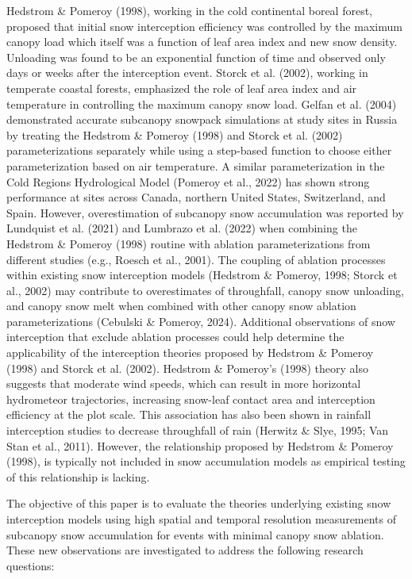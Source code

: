 \documentclass[
  letterpaper,
  DIV=11,
  numbers=noendperiod]{scrartcl}
\begin{document}
Hedstrom \& Pomeroy (1998), working in the cold continental boreal
forest, proposed that initial snow interception efficiency was
controlled by the maximum canopy load which itself was a function of
leaf area index and new snow density. Unloading was found to be an
exponential function of time and observed only days or weeks after the
interception event. Storck et al. (2002), working in temperate coastal
forests, emphasized the role of leaf area index and air temperature in
controlling the maximum canopy snow load. Gelfan et al. (2004)
demonstrated accurate subcanopy snowpack simulations at study sites in
Russia by treating the Hedstrom \& Pomeroy (1998) and Storck et al.
(2002) parameterizations separately while using a step-based function to
choose either parameterization based on air temperature. A similar
parameterization in the Cold Regions Hydrological Model (Pomeroy et al.,
2022) has shown strong performance at sites across Canada, northern
United States, Switzerland, and Spain. However, overestimation of
subcanopy snow accumulation was reported by Lundquist et al. (2021) and
Lumbrazo et al. (2022) when combining the Hedstrom \& Pomeroy (1998)
routine with ablation parameterizations from different studies (e.g.,
Roesch et al., 2001). The coupling of ablation processes within existing
snow interception models (Hedstrom \& Pomeroy, 1998; Storck et al.,
2002) may contribute to overestimates of throughfall, canopy snow
unloading, and canopy snow melt when combined with other canopy snow
ablation parameterizations (Cebulski \& Pomeroy, 2024). Additional
observations of snow interception that exclude ablation processes could
help determine the applicability of the interception theories proposed
by Hedstrom \& Pomeroy (1998) and Storck et al. (2002). Hedstrom \&
Pomeroy's (1998) theory also suggests that moderate wind speeds, which
can result in more horizontal hydrometeor trajectories, increasing
snow-leaf contact area and interception efficiency at the plot scale.
This association has also been shown in rainfall interception studies to
decrease throughfall of rain (Herwitz \& Slye, 1995; Van Stan et al.,
2011). However, the relationship proposed by Hedstrom \& Pomeroy (1998),
is typically not included in snow accumulation models as empirical
testing of this relationship is lacking.

The objective of this paper is to evaluate the theories underlying
existing snow interception models using high spatial and temporal
resolution measurements of subcanopy snow accumulation for events with
minimal canopy snow ablation. These new observations are investigated to
address the following research questions:
\end{document}
